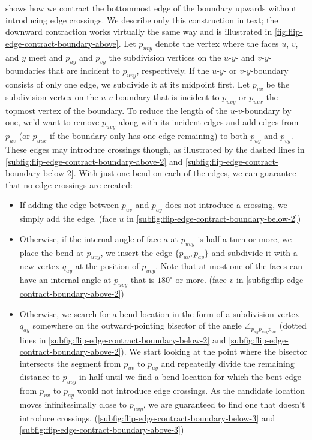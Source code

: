  shows how we contract the bottommost edge of the boundary upwards without introducing edge crossings. We describe only this construction in text; the downward contraction works virtually the same way and is illustrated in \cref{fig:flip-edge-contract-boundary-above}. Let $p_{uvy}$ denote the vertex where the faces $u$, $v$, and $y$ meet and $p_{uy}$ and $p_{vy}$ the subdivision vertices on the $u$-$y$- and $v$-$y$-boundaries that are incident to $p_{uvy}$, respectively. If the $u$-$y$- or $v$-$y$-boundary consists of only one edge, we subdivide it at its midpoint first. Let $p_{uv}$ be the subdivision vertex on the $u$-$v$-boundary that is incident to $p_{uvy}$ or $p_{uvx}$ the topmost vertex of the boundary. To reduce the length of the $u$-$v$-boundary by one, we'd want to remove $p_{uvy}$ along with its incident edges and add edges from $p_{uv}$ (or $p_{uvx}$ if the boundary only has one edge remaining) to both $p_{uy}$ and $p_{vy}$. These edges may introduce crossings though, as illustrated by the dashed lines in \cref{subfig:flip-edge-contract-boundary-above-2} and \cref{subfig:flip-edge-contract-boundary-below-2}. With just one bend on each of the edges, we can guarantee that no edge crossings are created:

\begin{itemize}
	\item If adding the edge between $p_{uv}$ and $p_{ay}$ does not introduce a crossing, we simply add the edge. (face $u$ in \cref{subfig:flip-edge-contract-boundary-below-2})
	\item Otherwise, if the internal angle of face $a$ at $p_{uvy}$ is half a turn or more, we place the bend at $p_{uvy}$, \ie{} we insert the edge $\{p_{uv},p_{ay}\}$ and subdivide it with a new vertex $q_{ay}$ at the position of $p_{uvy}$. Note that at most one of the faces can have an internal angle at $p_{uvy}$ that is $180^\circ$ or more. (face $v$ in \cref{subfig:flip-edge-contract-boundary-above-2})
	\item Otherwise, we search for a bend location in the form of a subdivision vertex $q_{ay}$ somewhere on the outward-pointing bisector of the angle $\angle_{p_{ay}p_{uvy}p_{uv}}$ (dotted lines in \cref{subfig:flip-edge-contract-boundary-below-2} and \cref{subfig:flip-edge-contract-boundary-above-2}). We start looking at the point where the bisector intersects the segment from $p_{uv}$ to $p_{ay}$ and repeatedly divide the remaining distance to $p_{uvy}$ in half until we find a bend location for which the bent edge from $p_{uv}$ to $p_{ay}$ would not introduce edge crossings. As the candidate location moves infinitesimally close to $p_{uvy}$, we are guaranteed to find one that doesn't introduce crossings. (\cref{subfig:flip-edge-contract-boundary-below-3} and \cref{subfig:flip-edge-contract-boundary-above-3})
\end{itemize}

